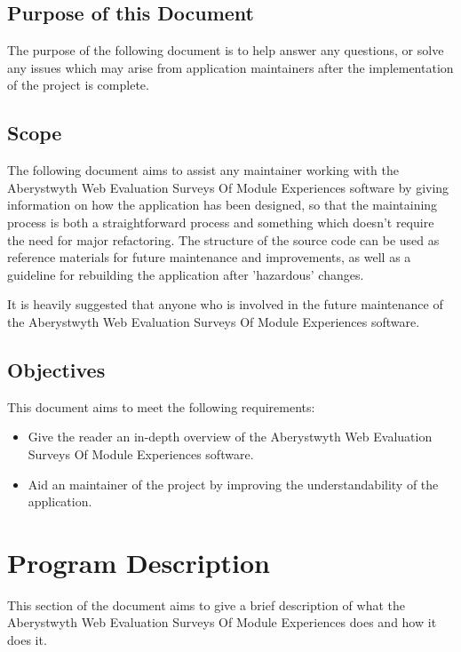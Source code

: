 \documentclass[11pt,a4paper]{article}
\begin{document}
\subsection{Purpose of this Document}

The purpose of the following document is to help answer any questions, or solve any issues which may arise from application maintainers after the implementation of the project is complete.

\subsection{Scope}

The following document aims to assist any maintainer working with the Aberystwyth Web Evaluation Surveys Of Module Experiences software by giving information on how the application has been designed, so that the maintaining process is both a straightforward process and something which doesn't require the need for major refactoring. The structure of the source code can be used as reference materials for future maintenance and improvements, as well as a guideline for rebuilding the application after 'hazardous' changes.

It is heavily suggested that anyone who is involved in the future maintenance of the Aberystwyth Web Evaluation Surveys Of Module Experiences software.

\subsection{Objectives}

This document aims to meet the following requirements:

\begin{itemize}
	\item Give the reader an in-depth overview of the Aberystwyth Web Evaluation Surveys Of Module Experiences software.
	\item Aid an maintainer of the project by improving the understandability of the application.
\end{itemize}

\clearpage

\section{Program Description}

This section of the document aims to give a brief description of what the Aberystwyth Web Evaluation Surveys Of Module Experiences does and how it does it.
\end{document}
